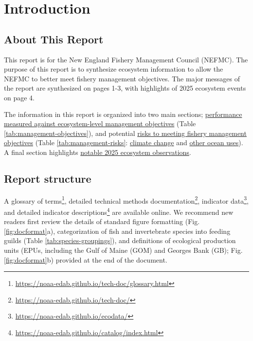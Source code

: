 \documentclass[
  10pt,
]{article}
\author{}
\date{\vspace{-2.5em}}
\begin{document}
\setcounter{page}{4}
\thispagestyle{fancy}

\section{Introduction}\label{introduction}

\subsection{About This Report}\label{about-this-report}

This report is for the New England Fishery Management Council (NEFMC). The purpose of this report is to synthesize ecosystem information to allow the NEFMC to better meet fishery management objectives. The major messages of the report are synthesized on pages 1-3, with highlights of 2025 ecosystem events on page 4.

The information in this report is organized into two main sections; \hyperref[performance-relative-to-fishery-management-objectives]{performance measured against ecosystem-level management objectives} (Table \ref{tab:management-objectives}), and potential \hyperref[risks-to-meeting-fishery-management-objectives]{risks to meeting fishery management objectives} (Table \ref{tab:management-risks}: \hyperref[climate-and-ecosystem-change]{climate change} and \hyperref[other-ocean-uses-offshore-wind]{other ocean uses}). A final section highlights \hyperref[highlights]{notable 2025 ecosystem observations}.

\subsection{Report structure}\label{report-structure}

A glossary of terms\footnote{\url{https://noaa-edab.github.io/tech-doc/glossary.html}}, detailed technical methods documentation\footnote{\url{https://noaa-edab.github.io/tech-doc/}}, indicator data\footnote{\url{https://noaa-edab.github.io/ecodata/}}, and detailed indicator descriptions\footnote{\url{https://noaa-edab.github.io/catalog/index.html}} are available online. We recommend new readers first review the details of standard figure formatting (Fig. \ref{fig:docformat}a), categorization of fish and invertebrate species into feeding guilds (Table \ref{tab:species-groupings}), and definitions of ecological production units (EPUs, including the Gulf of Maine (GOM) and Georges Bank (GB); Fig. \ref{fig:docformat}b) provided at the end of the document.
\end{document}
